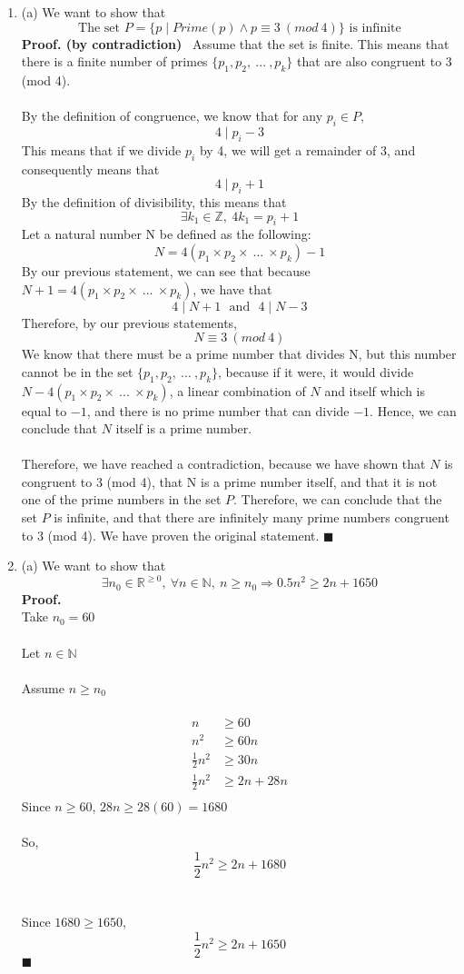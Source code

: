 \documentclass{article}
\newcommand{\Z}{\mathbb{Z}}
\newcommand{\R}{\mathbb{R}}
\newcommand{\N}{\mathbb{N}}
\begin{document}
\begin{enumerate}
	\item (a) We want to show that $$\textrm{The set } P=\{p \mid Prime(p) \wedge p \equiv 3\ (mod\ 4)\} \textrm{ is infinite}$$
	\textbf{Proof. (by contradiction)} \ Assume that the set is finite. This means that there is a finite number of primes $\{p_1, p_2,\ ...\ , p_k\}$ that are also congruent to 3 (mod 4). \\\\
	By the definition of congruence, we know that for any $p_i \in P$, $$4 \mid p_i - 3$$
	This means that if we divide $p_i$ by 4, we will get a remainder of 3, and consequently means that $$4 \mid p_i + 1$$
	By the definition of divisibility, this means that $$\exists k_1 \in \Z,\ 4k_1 = p_i+1$$
	Let a natural number N be defined as the following: $$N = 4(p_1 \times p_2 \times \ ...\ \times p_k) - 1$$
	By our previous statement, we can see that because $N + 1 = 4(p_1 \times p_2 \times \ ...\ \times p_k)$, we have that $$4 \mid N + 1\ \ \ \textrm{and}\ \ \ 4 \mid N - 3$$
	Therefore, by our previous statements, $$N \equiv 3\ (mod\ 4)$$
	We know that there must be a prime number that divides N, but this number cannot be in the set $\{p_1, p_2,\ ...\ , p_k\}$, because if it were, it would divide $N - 4(p_1 \times p_2 \times \ ...\ \times p_k)$, a linear combination of $N$ and itself which is equal to $-1$, and there is no prime number that can divide $-1$. Hence, we can conclude that $N$ itself is a prime number. \\\\
	Therefore, we have reached a contradiction, because we have shown that $N$ is congruent to 3 (mod 4), that N is a prime number itself, and that it is not one of the prime numbers in the set $P$. Therefore, we can conclude that the set $P$ is infinite, and that there are infinitely many prime numbers congruent to 3 (mod 4). We have proven the original statement. \null\hfill $\blacksquare$ \\
	
	\item (a) We want to show that $$\exists n_0 \in \R^{\geq 0},\ \forall n \in \N,\ n\geq n_0 \Rightarrow 0.5n^2 \geq 2n +1650$$
	\textbf{Proof.}\\
	Take $n_0 = 60$ \\\\ Let $n \in \N$ \\\\ Assume $n \geq n_0$\\\\
	\begin{align*}
		n&\geq 60\\
		n^2 &\geq 60n\\
		\frac{1}{2}n^2 &\geq 30n\\
		\frac{1}{2}n^2 &\geq 2n + 28n\\
	\end{align*}
	Since $n\geq 60$, $28n \geq 28(60) = 1680$\\\\
	So, $$\frac{1}{2} n^2\geq 2n+1680$$\\\\
	Since $1680 \geq 1650$, $$\frac{1}{2} n^2\geq 2n+1650$$	\null\hfill $\blacksquare$
	

\end{enumerate}
\end{document}
